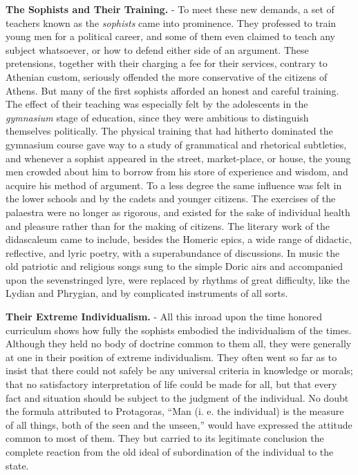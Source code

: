 \documentclass[]{book}
\begin{document}
\textbf{The Sophists and Their Training.} - To meet these new demands, a set of teachers known as the \emph{sophists} came into prominence. They professed to train young men for a political career, and some of them even claimed to teach any subject whatsoever, or how to defend either side of an argument. These pretensions, together with their charging a fee for their services, contrary to Athenian custom, seriously offended the more conservative of the citizens of Athens. But many of the first sophists afforded an honest and careful training. The effect of their teaching was especially felt by the adolescents in the \emph{gymnasium} stage of education, since they were ambitious to distinguish themselves politically. The physical training that had hitherto dominated the gymnasium course gave way to a study of grammatical and rhetorical subtleties, and whenever a sophist appeared in the street, market-place, or house, the young men crowded about him to borrow from his store of experience and wisdom, and acquire his method of argument. To a less degree the same influence was felt in the lower schools and by the cadets and younger citizens. The exercises of the palaestra were no longer as rigorous, and existed for the sake of individual health and pleasure rather than for the making of citizens. The literary work of the didascaleum came to include, besides the Homeric epics, a wide range of didactic, reflective, and lyric poetry, with a superabundance of discussions. In music the old patriotic and religious songs sung to the simple Doric airs and accompanied upon the sevenstringed lyre, were replaced by rhythms of great difficulty, like the Lydian and Phrygian, and by complicated instruments of all sorts.

\textbf{Their Extreme Individualism.} - All this inroad upon the time honored curriculum shows how fully the sophists embodied the individualism of the times. Although they held no body of doctrine common to them all, they were generally at one in their position of extreme individualism. They often went so far as to insist that there could not safely be any universal criteria in knowledge or morals; that no satisfactory interpretation of life could be made for all, but that every fact and situation should be subject to the judgment of the individual. No doubt the formula attributed to Protagoras, ``Man (i. e. the individual) is the measure of all things, both of the seen and the unseen,'' would have expressed the attitude common to most of them. They but carried to its legitimate conclusion the complete reaction from the old ideal of subordination of the individual to the state.
\end{document}
